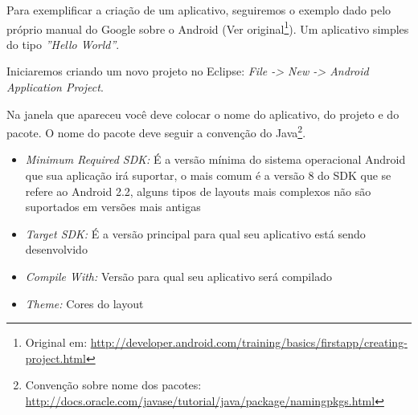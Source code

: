 \documentclass[a4paper,12pt,brazil,doubleside]{book}
\begin{document}
Para exemplificar a criação de um aplicativo, seguiremos o exemplo dado pelo próprio manual do Google sobre o Android (Ver original\footnote{Original em: \href{http://developer.android.com/training/basics/firstapp/creating-project.html}{http://developer.android.com/training/basics/firstapp/creating-project.html}}). Um aplicativo simples do tipo \textit{''Hello World''}.

Iniciaremos criando um novo projeto no Eclipse: \textit{File -> New -> Android Application Project}.

Na janela que apareceu você deve colocar o nome do aplicativo, do projeto e do pacote. O nome do pacote deve seguir a convenção do Java\footnote{Convenção sobre nome dos pacotes: \href{http://docs.oracle.com/javase/tutorial/java/package/namingpkgs.html}{http://docs.oracle.com/javase/tutorial/java/package/namingpkgs.html}}.
\begin{itemize}
	\item \textit{Minimum Required SDK:} É a versão mínima do sistema operacional Android que sua aplicação irá suportar, o mais comum é a versão 8 do SDK que se refere ao Android 2.2, alguns tipos de layouts mais complexos não são suportados em versões mais antigas
	\item \textit{Target SDK:} É a versão principal para qual seu aplicativo está sendo desenvolvido
	\item \textit{Compile With:} Versão para qual seu aplicativo será compilado
	\item \textit{Theme:} Cores do layout
\end{itemize}
\end{document}
